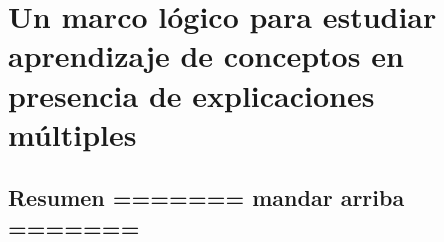 

\chapter{Un marco lógico para estudiar aprendizaje de conceptos en presencia de explicaciones múltiples}\label{chapter:BRM}

\section{Resumen ======= mandar arriba =======}
